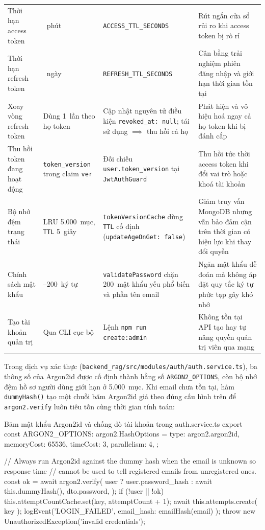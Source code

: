 \begin{longtable}{
  @{}>{\raggedright\arraybackslash}p{3.0cm}
  >{\raggedright\arraybackslash}p{2.7cm}
  >{\raggedright\arraybackslash}p{4.6cm}
  >{\raggedright\arraybackslash}p{4.7cm}@{}
}
Thời hạn access token & 15~phút & \texttt{ACCESS\_\allowbreak{}TTL\_\allowbreak{}SECONDS} & Rút ngắn cửa sổ rủi ro khi access token bị rò rỉ \\
Thời hạn refresh token & 7~ngày & \texttt{REFRESH\_\allowbreak{}TTL\_\allowbreak{}SECONDS} & Cân bằng trải nghiệm phiên đăng nhập và giới hạn thời gian tồn tại \\
Xoay vòng refresh token & Dùng 1~lần theo họ token & Cập nhật nguyên tử điều kiện \texttt{revoked\_\allowbreak{}at:\allowbreak{} null}; tái sử dụng $\implies$ thu hồi cả họ & Phát hiện và vô hiệu hoá ngay cả họ token khi bị đánh cắp \\
Thu hồi token đang hoạt động & \texttt{token\_version} trong claim \texttt{ver} & Đối chiếu \texttt{user.token\_version} tại \texttt{JwtAuthGuard} & Thu hồi tức thời access token khi đổi vai trò hoặc khoá tài khoản \\
Bộ nhớ đệm trạng thái & LRU 5.000~mục, \texttt{TTL} 5~giây & \texttt{tokenVersionCache} dùng \texttt{TTL} cố định (\texttt{updateAgeOnGet:\allowbreak{} false}) & Giảm truy vấn MongoDB nhưng vẫn bảo đảm cận trên thời gian có hiệu lực khi thay đổi quyền \\
Chính sách mật khẩu & 10--200~ký tự & \texttt{validatePassword} chặn 200~mật khẩu yếu phổ biến và phần tên email & Ngăn mật khẩu dễ đoán mà không áp đặt quy tắc ký tự phức tạp gây khó nhớ \\
Tạo tài khoản quản trị & Qua CLI cục bộ & Lệnh \texttt{npm run create:admin} & Không tồn tại API tạo hay tự nâng quyền quản trị viên qua mạng \\
\end{longtable}
\endgroup

Trong dịch vụ xác thực (\texttt{backend\_\allowbreak{}rag/\allowbreak{}src/\allowbreak{}modules/\allowbreak{}auth/\allowbreak{}auth.\allowbreak{}service.\allowbreak{}ts}), ba thông số của Argon2id được cố định thành hằng số \texttt{ARGON2\_\allowbreak{}OPTIONS}, còn bộ nhớ đệm hồ sơ người dùng giới hạn ở 5.000~mục. Khi email chưa tồn tại, hàm \texttt{dummyHash()} tạo một chuỗi băm Argon2id giả theo đúng cấu hình trên để \texttt{argon2.verify} luôn tiêu tốn cùng thời gian tính toán:

\begin{tsbox}{Băm mật khẩu Argon2id và chống dò tài khoản trong auth.service.ts}
export const ARGON2_OPTIONS: argon2.HashOptions = {
  type: argon2.argon2id,
  memoryCost: 65536,
  timeCost: 3,
  parallelism: 4,
};

// Always run Argon2id against the dummy hash when the email is unknown so response time
// cannot be used to tell registered emails from unregistered ones.
const ok = await argon2.verify(
  user ? user.password_hash : await this.dummyHash(),
  dto.password,
);
if (!user || !ok) {
  this.attemptCountCache.set(key, attemptCount + 1);
  await this.attempts.create({ key });
  logEvent('LOGIN_FAILED', { email_hash: emailHash(email) });
  throw new UnauthorizedException('invalid credentials');
}
\end{tsbox}

